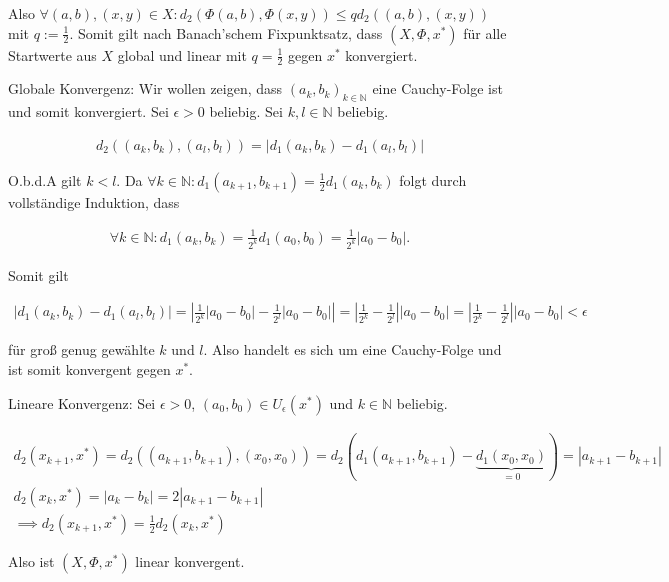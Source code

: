 \documentclass[]{article}
\begin{document}
\begin{enumerate}[label=\alph*)]
	Also $\forall (a,b), (x,y) \in X: d_2(\Phi(a,b), \Phi(x,y)) \le q d_2((a,b),(x,y))$ mit $q:=\frac{1}{2}$. Somit gilt nach Banach'schem Fixpunktsatz, dass $(X, \Phi, x^*)$ für alle Startwerte aus $X$ global und linear mit $q=\frac{1}{2}$ gegen $x^*$ konvergiert.
	
	Globale Konvergenz: Wir wollen zeigen, dass $(a_k, b_k)_{k \in \mathbb{N}}$ eine Cauchy-Folge ist und somit konvergiert. Sei $\epsilon > 0$ beliebig. Sei $k, l \in \mathbb{N}$ beliebig.
	
	\begin{align*}
		d_2((a_k, b_k), (a_l, b_l)) = |d_1(a_k, b_k) - d_1(a_l, b_l)|
	\end{align*}
	
	O.b.d.A gilt $k < l$. Da $\forall k \in \mathbb{N}: d_1(a_{k+1}, b_{k+1}) = \frac{1}{2}d_1(a_k, b_k)$ folgt durch vollständige Induktion, dass
	
	\begin{align*}
		\forall k \in \mathbb{N}: d_1(a_k, b_k) = \frac{1}{2^{k}}d_1(a_0, b_0) =\frac{1}{2^{k}}|a_0 - b_0|.
	\end{align*}
	
	Somit gilt
	
	\begin{align*}
		|d_1(a_k, b_k) - d_1(a_l, b_l)| = \left|\frac{1}{2^{k}}|a_0 - b_0| - \frac{1}{2^{l}}|a_0 - b_0|\right| = \left|\frac{1}{2^{k}}-\frac{1}{2^{l}}\right||a_0 - b_0| = \left|\frac{1}{2^{k}}-\frac{1}{2^{l}}\right||a_0 - b_0| < \epsilon
	\end{align*}
	
	für groß genug gewählte $k$ und $l$. Also handelt es sich um eine Cauchy-Folge und ist somit konvergent gegen $x^*$.  
	
	
	
	Lineare Konvergenz: Sei $\epsilon >0$, $(a_0, b_0) \in U_\epsilon(x^*)$ und $k \in \mathbb{N}$ beliebig.
	
	\begin{align*}
		d_2(x_{k+1},x^*) = d_2((a_{k+1}, b_{k+1}), (x_0, x_0)) = d_2(d_1(a_{k+1}, b_{k+1}) - \underbrace{d_1(x_0, x_0)}_{=0}) = |a_{k+1} - b_{k+1}| \\
		d_2(x_{k}, x^*) = |a_{k} - b_{k}| = 2 |a_{k+1} - b_{k+1}| \\
		\implies d_2(x_{k+1}, x^*) = \frac{1}{2} d_2(x_k, x^*)
	\end{align*}

	Also ist $(X, \Phi, x^*)$ linear konvergent.

	
	
\end{enumerate}
\end{document}
